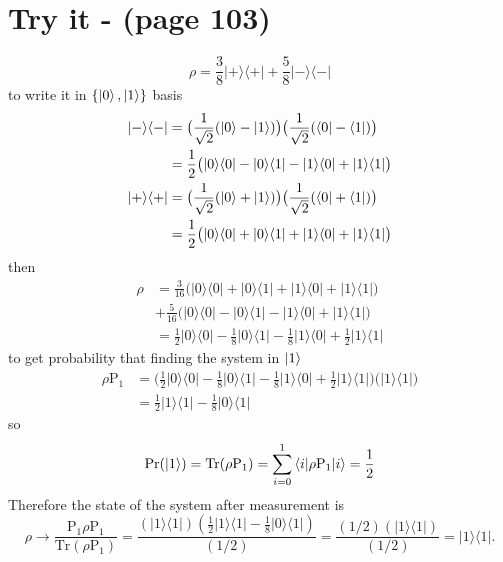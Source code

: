 \documentclass{article}
\newcommand{\op}[2]{|#1\rangle \langle#2|}
\newcommand{\sand}[3]{\braket{#1 | #2 | #3}}
\begin{document}
\section*{Try it - (page 103)}
\begin{equation*}
   \rho = \frac{3}{8}\op{+}{+} + \frac{5}{8}\op{-}{-}
\end{equation*}
to write it in $\{\ket{0}, \ket{1}\}$ basis
\begin{align*}
   \op{-}{-} &= \big(\frac{1}{\sqrt{2}}(\ket{0} - \ket{1})\big)\big(\frac{1}{\sqrt{2}}(\bra{0} - \bra{1})\big) \nonumber \\
   &= \frac{1}{2}\big(\op{0}{0} - \op{0}{1} - \op{1}{0} + \op{1}{1}\big) \nonumber\\
   \op{+}{+} &= \big(\frac{1}{\sqrt{2}}(\ket{0} + \ket{1})\big)\big(\frac{1}{\sqrt{2}}(\bra{0} + \bra{1})\big) \nonumber \\
   &= \frac{1}{2}\big(\op{0}{0} + \op{0}{1} + \op{1}{0} + \op{1}{1}\big) \nonumber
\end{align*}
then
\begin{align*}
   \rho &= \frac{3}{16}\big(\op{0}{0} + \op{0}{1} + \op{1}{0} + \op{1}{1}\big) \\
   &+ \frac{5}{16}\big(\op{0}{0} - \op{0}{1} - \op{1}{0} + \op{1}{1}\big) \\
   &= \frac{1}{2}\op{0}{0} - \frac{1}{8}\op{0}{1} - \frac{1}{8}\op{1}{0} + \frac{1}{2}\op{1}{1} 
\end{align*}
to get probability that finding the system in $\ket{1}$
\begin{align*}
   \rho \text{P}_{1} &= \big(\frac{1}{2}\op{0}{0} - \frac{1}{8}\op{0}{1} - \frac{1}{8}\op{1}{0} + \frac{1}{2}\op{1}{1}\big)\big(\op{1}{1}\big) \\
   &= \frac{1}{2}\op{1}{1} - \frac{1}{8}\op{0}{1}
\end{align*}
so
\begin{equation*}
   \text{Pr}(\ket{1}) = \text{Tr}(\rho \text{P}_{1}) = \sum_{i=0}^{1} \sand{i}{\rho \text{P}_{1}}{i} = \frac{1}{2}
\end{equation*}
Therefore the state of the system after measurement is
\begin{equation*}
   \rho \rightarrow \frac{\text{P}_{1} \rho \text{P}_{1}}{\text{Tr}(\rho \text{P}_{1})} = \frac{(\op{1}{1})(\frac{1}{2}\op{1}{1} - \frac{1}{8}\op{0}{1})}{(1/2)} = \frac{(1/2)(\op{1}{1})}{(1/2)} = \op{1}{1}.
\end{equation*}
\end{document}
